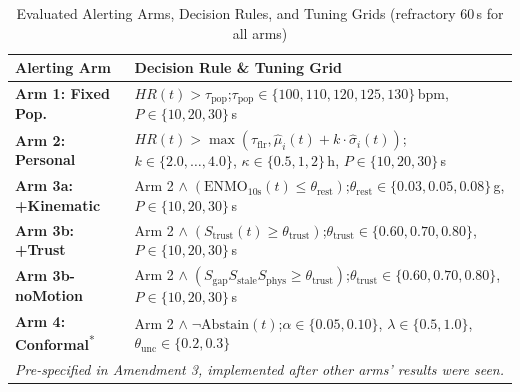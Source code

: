 \begin{table}[t]
\caption{Evaluated Alerting Arms, Decision Rules, and Tuning Grids (refractory $60$\,s for all arms)}
\label{tab:alerting_arms}
\centering
\footnotesize
\renewcommand{\arraystretch}{0.95}
\setlength{\tabcolsep}{2.5pt}
\begin{tabular}{|p{2.7cm}|p{5.3cm}|}
\hline
\textbf{Alerting Arm} & \textbf{Decision Rule \& Tuning Grid} \\
\hline
\textbf{Arm 1: Fixed Pop.} & $HR(t) > \tau_{\text{pop}}$;\newline $\tau_{\text{pop}} \in \{100, 110, 120, 125, 130\}$\,bpm, $P \in \{10, 20, 30\}$\,s \\[2pt]
\hline
\textbf{Arm 2: Personal} & $HR(t) > \max(\tau_{\text{flr}}, \hat{\mu}_i(t) + k \cdot \hat{\sigma}_i(t))$;\newline $k \in \{2.0, \dots, 4.0\}$, $\kappa \in \{0.5, 1, 2\}$\,h, $P \in \{10, 20, 30\}$\,s \\[2pt]
\hline
\textbf{Arm 3a: +Kinematic} & Arm 2 $\land\; (\text{ENMO}_{10\text{s}}(t) \le \theta_{\text{rest}})$;\newline $\theta_{\text{rest}} \in \{0.03, 0.05, 0.08\}$\,g, $P \in \{10, 20, 30\}$\,s \\[2pt]
\hline
\textbf{Arm 3b: +Trust} & Arm 2 $\land\; (S_{\text{trust}}(t) \ge \theta_{\text{trust}})$;\newline $\theta_{\text{trust}} \in \{0.60, 0.70, 0.80\}$, $P \in \{10, 20, 30\}$\,s \\[2pt]
\hline
\textbf{Arm 3b-noMotion} & Arm 2 $\land\; (S_{\text{gap}} S_{\text{stale}} S_{\text{phys}} \ge \theta_{\text{trust}})$;\newline $\theta_{\text{trust}} \in \{0.60, 0.70, 0.80\}$, $P \in \{10, 20, 30\}$\,s \\[2pt]
\hline
\textbf{Arm 4: Conformal}\textsuperscript{*} & Arm 2 $\land\; \neg \text{Abstain}(t)$;\newline $\alpha \in \{0.05, 0.10\}$, $\lambda \in \{0.5, 1.0\}$, $\theta_{\text{unc}} \in \{0.2, 0.3\}$ \\[2pt]
\hline
\multicolumn{2}{|p{8.0cm}|}{\scriptsize *\textit{Pre-specified in Amendment 3, implemented after other arms' results were seen.}} \\
\hline
\end{tabular}
\end{table}
